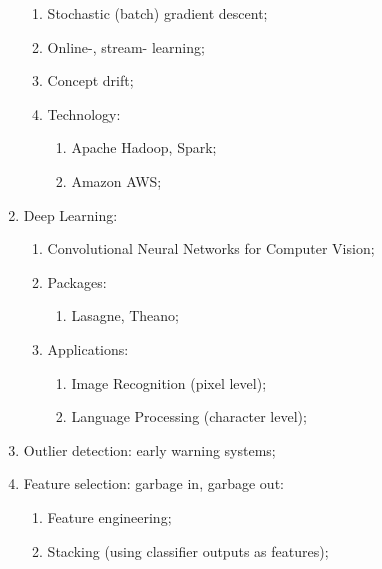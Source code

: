 \documentclass[a4paper]{article}
\begin{document}
\begin{enumerate}
\begin{enumerate}
    \item Stochastic (batch) gradient descent;
    \item Online-, stream- learning;
    \item Concept drift;
    \item Technology: \begin{enumerate}
      \item Apache Hadoop, Spark;
      \item Amazon AWS;
    \end{enumerate}
  \end{enumerate}
  \item Deep Learning: \begin{enumerate}
    \item Convolutional Neural Networks for Computer Vision;
    \item Packages: \begin{enumerate}
      \item Lasagne, Theano;
    \end{enumerate}
    \item Applications: \begin{enumerate}
      \item Image Recognition (pixel level);
      \item Language Processing (character level);
    \end{enumerate}
  \end{enumerate}
  \item Outlier detection: early warning systems;
  \item Feature selection: garbage in, garbage out: \begin{enumerate}
    \item Feature engineering;
    \item Stacking (using classifier outputs as features);
  \end{enumerate}
\end{enumerate}

\clearpage
\end{document}
